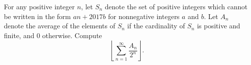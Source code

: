 For any positive integer $n$, let $S_n$ denote the set of positive integers which cannot be written in the form $an+2017b$ for nonnegative integers $a$ and $b$. Let $A_n$ denote the average of the elements of $S_n$ if the cardinality of $S_n$ is positive and finite, and $0$ otherwise. Compute \[\left\lfloor\displaystyle\sum_{n=1}^{\infty}\frac{A_n}{2^n}\right\rfloor.\]
